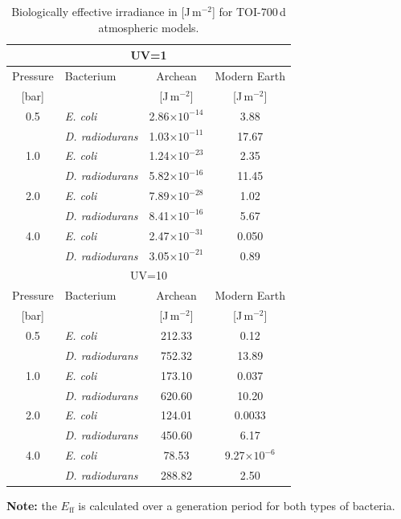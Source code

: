 \begin{table}
\caption{Biologically effective irradiance in [J\,m$^{-2}$] for TOI-700\,d atmospheric models.}
\begin{center}
    \begin{tabular}{c|lcc}
    \hline
    \multicolumn{4}{c}{UV=1}\\
    \hline
    Pressure  & Bacterium & Archean & Modern Earth \\
    
    [bar] & & [J\,m$^{-2}$] & [J\,m$^{-2}$]\\
    \hline
    0.5 &	\textit{E. coli} & 2.86$\times10^{-14}$ & 3.88 \\
     & \textit{D. radiodurans} & 1.03$\times10^{-11}$ & 17.67 \\
    1.0 &	\textit{E. coli} & 1.24$\times10^{-23}$ & 2.35 \\
    & \textit{D. radiodurans} & 5.82$\times10^{-16}$ & 11.45 \\
    2.0 &	\textit{E. coli} & 7.89$\times10^{-28}$ & 1.02 \\
    & \textit{D. radiodurans} & 8.41$\times10^{-16}$ & 5.67\\
    4.0 &	\textit{E. coli} & 2.47$\times10^{-31}$ & 0.050 \\
    & \textit{D. radiodurans}	& 3.05$\times10^{-21}$	& 0.89\\
    \hline
    \multicolumn{4}{c}{UV=10}\\
    \hline
    Pressure  & Bacterium & Archean & Modern Earth \\
        
    [bar] & & [J\,m$^{-2}$] & [J\,m$^{-2}$]\\
    \hline
    0.5 &	\textit{E. coli} & 212.33 & 0.12 \\
     & \textit{D. radiodurans} & 752.32 & 13.89\\
    1.0 &	\textit{E. coli} & 173.10 & 0.037 \\
    & \textit{D. radiodurans} & 620.60 & 10.20\\
    2.0 &	\textit{E. coli} & 124.01 & 0.0033 \\
    & \textit{D. radiodurans} & 450.60 & 6.17\\
    4.0 &	\textit{E. coli} & 78.53 & 9.27$\times10^{-6}$\\
    & \textit{D. radiodurans} & 288.82 & 2.50\\
    \hline
    \end{tabular}
\raggedright\textbf{Note:} the $E_\mathrm{ff}$ is calculated over a generation period for both types of bacteria.
\end{center}
\label{tab:eff}
\end{table}

